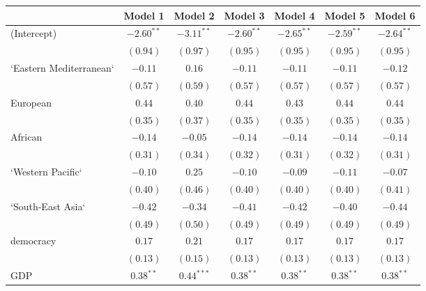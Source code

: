 
\begin{table}[!h]
\begin{center}
\begin{tabular}{l c c c c c c }
\toprule
 & Model 1 & Model 2 & Model 3 & Model 4 & Model 5 & Model 6 \\
\midrule
(Intercept)             & $-2.60^{**}$ & $-3.11^{**}$ & $-2.60^{**}$ & $-2.65^{**}$ & $-2.59^{**}$ & $-2.64^{**}$ \\
                        & $(0.94)$     & $(0.97)$     & $(0.95)$     & $(0.95)$     & $(0.95)$     & $(0.95)$     \\
`Eastern Mediterranean` & $-0.11$      & $0.16$       & $-0.11$      & $-0.11$      & $-0.11$      & $-0.12$      \\
                        & $(0.57)$     & $(0.59)$     & $(0.57)$     & $(0.57)$     & $(0.57)$     & $(0.57)$     \\
European                & $0.44$       & $0.40$       & $0.44$       & $0.43$       & $0.44$       & $0.44$       \\
                        & $(0.35)$     & $(0.37)$     & $(0.35)$     & $(0.35)$     & $(0.35)$     & $(0.35)$     \\
African                 & $-0.14$      & $-0.05$      & $-0.14$      & $-0.14$      & $-0.14$      & $-0.14$      \\
                        & $(0.31)$     & $(0.34)$     & $(0.32)$     & $(0.31)$     & $(0.32)$     & $(0.31)$     \\
`Western Pacific`       & $-0.10$      & $0.25$       & $-0.10$      & $-0.09$      & $-0.11$      & $-0.07$      \\
                        & $(0.40)$     & $(0.46)$     & $(0.40)$     & $(0.40)$     & $(0.40)$     & $(0.41)$     \\
`South-East Asia`       & $-0.42$      & $-0.34$      & $-0.41$      & $-0.42$      & $-0.40$      & $-0.44$      \\
                        & $(0.49)$     & $(0.50)$     & $(0.49)$     & $(0.49)$     & $(0.49)$     & $(0.49)$     \\
democracy               & $0.17$       & $0.21$       & $0.17$       & $0.17$       & $0.17$       & $0.17$       \\
                        & $(0.13)$     & $(0.15)$     & $(0.13)$     & $(0.13)$     & $(0.13)$     & $(0.13)$     \\
GDP                     & $0.38^{**}$  & $0.44^{***}$ & $0.38^{**}$  & $0.38^{**}$  & $0.38^{**}$  & $0.38^{**}$  \\

\end{tabular}
\end{center}
\end{table}
